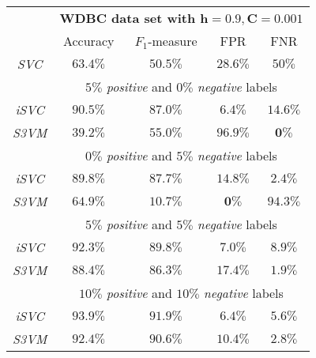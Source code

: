 \begin{table}[!t]
\small
\setlength{\tabcolsep}{10pt}
\renewcommand{\arraystretch}{1.3}
\label{tbl:real_03}
\centering
\begin{tabular}{|c||c|c|c|c|}
\hline
& \multicolumn{4}{c|}{\textbf{WDBC data set with $\mathbf{h=0.9, C=0.001}$}}\\
\cline{2-5}
& Accuracy & $F_1$-measure & FPR & FNR \\
\hline
\textit{SVC} & $63.4\%$ & $50.5\%$ & $28.6\%$ &$50\%$ \\\hline
& \multicolumn{4}{c|}{$5\%$ \textit{positive} and $0\%$ \textit{negative} labels}\\
\hline
\textit{iSVC} & $\mathbf{90.5\%}$ & $\mathbf{87.0\%}$ & $\mathbf{6.4\%}$ &$14.6\%$ \\\hline
\textit{S3VM} & $39.2\%$ & $55.0\%$ & $96.9\%$ &$\mathbf{0\%}$ \\\hline
& \multicolumn{4}{c|}{$0\%$ \textit{positive} and $5\%$ \textit{negative} labels}\\
\hline
\textit{iSVC} & $\mathbf{89.8\%}$ & $\mathbf{87.7\%}$ & $14.8\%$ &$2.4\%$ \\\hline
\textit{S3VM} & $64.9\%$ & $10.7\%$ & $\mathbf{0\%}$ &$94.3\%$ \\\hline
& \multicolumn{4}{c|}{$5\%$ \textit{positive} and $5\%$ \textit{negative} labels}\\
\hline
\textit{iSVC} & $\mathbf{92.3\%}$ & $\mathbf{89.8\%}$ & $\mathbf{7.0\%}$ &$8.9\%$ \\\hline
\textit{S3VM} & $88.4\%$ & $86.3\%$ & $17.4\%$ &$\mathbf{1.9\%}$ \\\hline
& \multicolumn{4}{c|}{$10\%$ \textit{positive} and $10\%$ \textit{negative} labels} \\
\hline
\textit{iSVC} & $\mathbf{93.9\%}$ & $\mathbf{91.9\%}$ & $\mathbf{6.4\%}$ &$5.6\%$ \\\hline
\textit{S3VM} & $92.4\%$ & $90.6\%$ & $10.4\%$ &$\mathbf{2.8\%}$ \\\hline
\end{tabular}
\end{table}